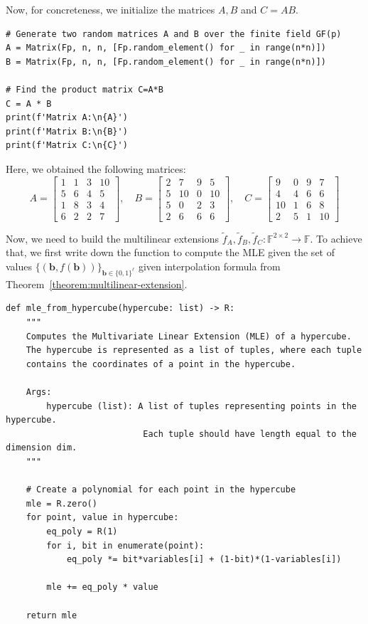 \documentclass{gkr-template}
\begin{document}
Now, for concreteness, we initialize the matrices $A,B$ and $C=AB$.
\begin{verbatim}
# Generate two random matrices A and B over the finite field GF(p)
A = Matrix(Fp, n, n, [Fp.random_element() for _ in range(n*n)])
B = Matrix(Fp, n, n, [Fp.random_element() for _ in range(n*n)])

# Find the product matrix C=A*B
C = A * B
print(f'Matrix A:\n{A}')
print(f'Matrix B:\n{B}')
print(f'Matrix C:\n{C}')
\end{verbatim}

Here, we obtained the following matrices:
\begin{equation*}
    A = \begin{bmatrix}
    1 & 1 & 3 & 10 \\
    5 & 6 & 4 & 5 \\
    1 & 8 & 3 & 4 \\
    6 & 2 & 2 & 7
    \end{bmatrix}, \quad B = \begin{bmatrix}
    2 & 7 & 9 & 5 \\
    5 & 10 & 0 & 10 \\
    5 & 0 & 2 & 3 \\
    2 & 6 & 6 & 6
    \end{bmatrix}, \quad C = \begin{bmatrix}
    9 & 0 & 9 & 7 \\
    4 & 4 & 6 & 6 \\
    10 & 1 & 6 & 8 \\
    2 & 5 & 1 & 10
    \end{bmatrix}
\end{equation*}

Now, we need to build the multilinear extensions $\widetilde{f}_A,
\widetilde{f}_B, \widetilde{f}_C: \mathbb{F}^{2 \times 2} \to \mathbb{F}$. To
achieve that, we first write down the function to compute the MLE given the set
of values $\{(\boldsymbol{b}, f(\boldsymbol{b}))\}_{\boldsymbol{b} \in
\{0,1\}^{\ell}}$ given interpolation formula from
Theorem~\ref{theorem:multilinear-extension}.
\begin{verbatim}
def mle_from_hypercube(hypercube: list) -> R:
    """
    Computes the Multivariate Linear Extension (MLE) of a hypercube.
    The hypercube is represented as a list of tuples, where each tuple
    contains the coordinates of a point in the hypercube.

    Args:
        hypercube (list): A list of tuples representing points in the hypercube.
                           Each tuple should have length equal to the dimension dim.
    """

    # Create a polynomial for each point in the hypercube
    mle = R.zero()
    for point, value in hypercube:
        eq_poly = R(1)
        for i, bit in enumerate(point):
            eq_poly *= bit*variables[i] + (1-bit)*(1-variables[i])

        mle += eq_poly * value
    
    return mle
\end{verbatim}
\end{document}
